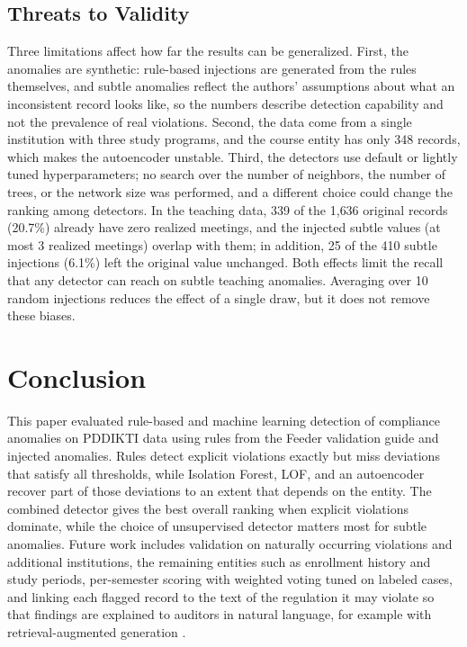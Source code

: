 \documentclass[conference]{IEEEtran}
\begin{document}
\subsection{Threats to Validity}
Three limitations affect how far the results can be generalized. First, the anomalies are synthetic: rule-based injections are generated from the rules themselves, and subtle anomalies reflect the authors' assumptions about what an inconsistent record looks like, so the numbers describe detection capability and not the prevalence of real violations. Second, the data come from a single institution with three study programs, and the course entity has only 348 records, which makes the autoencoder unstable. Third, the detectors use default or lightly tuned hyperparameters; no search over the number of neighbors, the number of trees, or the network size was performed, and a different choice could change the ranking among detectors. In the teaching data, 339 of the 1{,}636 original records (20.7\%) already have zero realized meetings, and the injected subtle values (at most 3 realized meetings) overlap with them; in addition, 25 of the 410 subtle injections (6.1\%) left the original value unchanged. Both effects limit the recall that any detector can reach on subtle teaching anomalies. Averaging over 10 random injections reduces the effect of a single draw, but it does not remove these biases.

\section{Conclusion}
This paper evaluated rule-based and machine learning detection of compliance anomalies on PDDIKTI data using rules from the Feeder validation guide and injected anomalies. Rules detect explicit violations exactly but miss deviations that satisfy all thresholds, while Isolation Forest, LOF, and an autoencoder recover part of those deviations to an extent that depends on the entity. The combined detector gives the best overall ranking when explicit violations dominate, while the choice of unsupervised detector matters most for subtle anomalies. Future work includes validation on naturally occurring violations and additional institutions, the remaining entities such as enrollment history and study periods, per-semester scoring with weighted voting tuned on labeled cases, and linking each flagged record to the text of the regulation it may violate so that findings are explained to auditors in natural language, for example with retrieval-augmented generation \cite{gao2023rag}.
\end{document}
